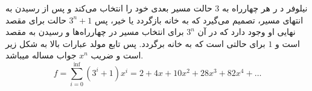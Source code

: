 \p
	نیلوفر د ر هر چهارراه به 3 حالت مسیر بعدی خود را انتخاب می‌کند و پس از رسیدن به انتهای مسیر، تصمیم می‌گیرد که به خانه بازگردد یا خیر، پس 
	$3^n + 1$
	حالت برای مقصد نهایی او وجود دارد که در آن
	$3^n$
	برای انتخاب مسیر در چهارراه‌ها و رسیدن به مقصد است و
	$1$
	برای حالتی است که به خانه برگردد.
	پس تابع مولد عبارات بالا به شکل زیر است و ضریب $x^n$
	جواب مساله میباشد.
	$$f = \sum\limits_{i=0}^{\inf} (3^i + 1) x^i = 2 + 4x + 10x^2 + 28x^3 + 82x^4 + \ldots$$
